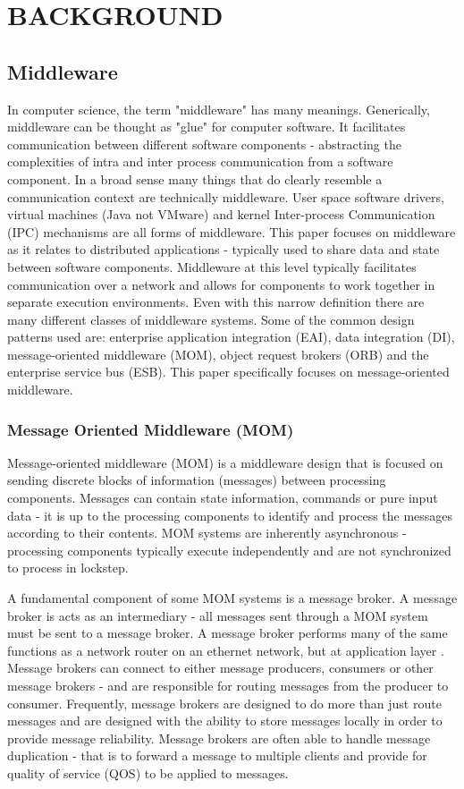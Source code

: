 \documentclass{thesis}
\begin{document}
\chapter{BACKGROUND}

\section{Middleware}
In computer science, the term "middleware" has many meanings.  Generically, middleware can be thought as "glue"  for computer software.  It facilitates communication between different software components - abstracting the complexities of intra and inter process communication from a software component.  In a broad sense many things that do clearly resemble a communication context are technically middleware.  User space software drivers, virtual machines (Java not VMware) and kernel Inter-process Communication (IPC) mechanisms are all forms of middleware.  This paper focuses on middleware as it relates to distributed applications - typically used to share data and state between software components.  Middleware at this level typically facilitates communication over a network and allows for components to work together in separate execution environments.  Even with this narrow definition there are many different classes of middleware systems.  Some of the common design patterns used are: enterprise application integration (EAI), data integration (DI), message-oriented middleware (MOM), object request brokers (ORB) and the enterprise service bus (ESB).  This paper specifically focuses on message-oriented middleware. 

\subsection{Message Oriented Middleware (MOM)}
Message-oriented middleware (MOM) is a middleware design that is focused on sending discrete blocks of information (messages) between processing components.  Messages can contain state information, commands or pure input data - it is up to the processing components to identify and process the messages according to their contents.  MOM systems are inherently asynchronous - processing components typically execute independently and are not synchronized to process in lockstep.

A fundamental component of some MOM systems is a message broker.  A message broker is acts as an intermediary - all messages sent through a MOM system must be sent to a message broker.  A message broker performs many of the same functions as a network router on an ethernet network, but at application layer \cite{zimmermann1980osi}.  Message brokers can connect to either message producers, consumers or other message brokers - and are responsible for routing messages from the producer to consumer.  Frequently, message brokers are designed to do more than just route messages and are designed with the ability to store messages locally in order to provide message reliability.  Message brokers are often able to handle message duplication - that is to forward a message to multiple clients and provide for quality of service (QOS) to be applied to messages.  
\end{document}
